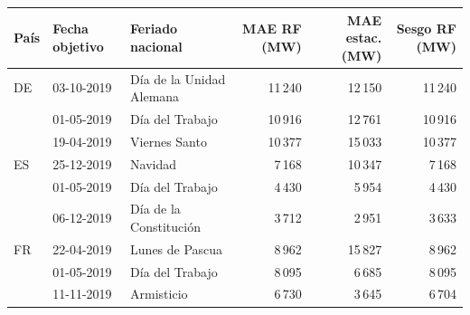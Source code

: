 \begin{tabular}{llp{4.2cm}rrr}
\toprule
País & Fecha objetivo & Feriado nacional & MAE RF (MW) & MAE estac. (MW) & Sesgo RF (MW) \\
\midrule
DE & 03-10-2019 & Día de la Unidad Alemana & 11\,240 & 12\,150 & 11\,240 \\
 & 01-05-2019 & Día del Trabajo & 10\,916 & 12\,761 & 10\,916 \\
 & 19-04-2019 & Viernes Santo & 10\,377 & 15\,033 & 10\,377 \\
\midrule
ES & 25-12-2019 & Navidad & 7\,168 & 10\,347 & 7\,168 \\
 & 01-05-2019 & Día del Trabajo & 4\,430 & 5\,954 & 4\,430 \\
 & 06-12-2019 & Día de la Constitución & 3\,712 & 2\,951 & 3\,633 \\
\midrule
FR & 22-04-2019 & Lunes de Pascua & 8\,962 & 15\,827 & 8\,962 \\
 & 01-05-2019 & Día del Trabajo & 8\,095 & 6\,685 & 8\,095 \\
 & 11-11-2019 & Armisticio & 6\,730 & 3\,645 & 6\,704 \\
\bottomrule
\end{tabular}